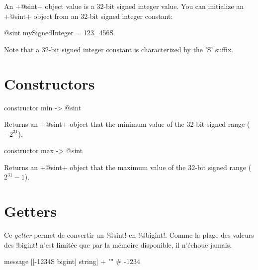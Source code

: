 

An \ggs+@sint+ object value is a 32-bit signed integer value. You can initialize an \ggs+@sint+ object from an 32-bit signed integer constant:\\

\begin{galgas}
@sint mySignedInteger = 123_456S
\end{galgas}


Note that a 32-bit signed integer constant is characterized by the 'S' suffix.


\section{Constructors}


\begin{galgas}
constructor min -> @sint
\end{galgas}

Returns an \ggs+@sint+ object that the minimum value of the 32-bit signed range ($-2^{31}$).






\begin{galgas}
constructor max -> @sint
\end{galgas}


Returns an \ggs+@sint+ object that the maximum value of the 32-bit signed range ($2^{31}-1$).



\section{Getters}


Ce \emph{getter} permet de convertir un \ggs!@sint! en \ggs!@bigint!. Comme la plage des valeurs des \ggs!bigint! n'est limitée que par la mémoire disponible, il n'échoue jamais.

\begin{galgas}
  message [[-1234S bigint] string] + "\n" # -1234
\end{galgas}



